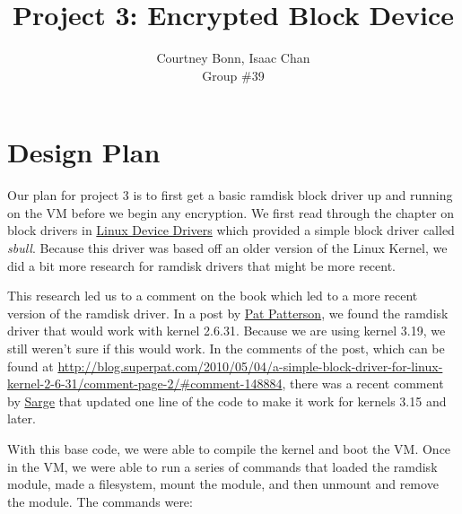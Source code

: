 \documentclass[letterpaper,10pt,draftclsnofoot,onecolumn,titlepage]{IEEEtran}
\def\name{Courtney Bonn, Isaac Chan}
\def\grp{Group \#39}
\begin{document}
\title{Project 3: Encrypted Block Device}
\author{\name \\ \grp}

\maketitle

\begin{abstract}
\end{abstract}

\section{Design Plan}
Our plan for project 3 is to first get a basic ramdisk block driver up and running on the VM before we begin any encryption. 
We first read through the chapter on block drivers in \href{https://lwn.net/Kernel/LDD3/}{Linux Device Drivers} which provided a simple block driver called \textit{sbull}. 
Because this driver was based off an older version of the Linux Kernel, we did a bit more research for ramdisk drivers that might be more recent. 

This research led us to a comment on the book which led to a more recent version of the ramdisk driver. 
In a post by \href{http://blog.superpat.com/2010/05/04/a-simple-block-driver-for-linux-kernel-2-6-31/comment-page-2/#comment-148884}{Pat Patterson}, we found the ramdisk driver that would work with kernel 2.6.31. 
Because we are using kernel 3.19, we still weren't sure if this would work. 
In the comments of the post, which can be found at \url{http://blog.superpat.com/2010/05/04/a-simple-block-driver-for-linux-kernel-2-6-31/comment-page-2/#comment-148884}, there was a recent comment by \href{http://blog.superpat.com/2010/05/04/a-simple-block-driver-for-linux-kernel-2-6-31/comment-page-2/#comment-148884}{Sarge} that updated one line of the code to make it work for kernels 3.15 and later.  

With this base code, we were able to compile the kernel and boot the VM. 
Once in the VM, we were able to run a series of commands that loaded the ramdisk module, made a filesystem, mount the module, and then unmount and remove the module. The commands were:
\end{document}
